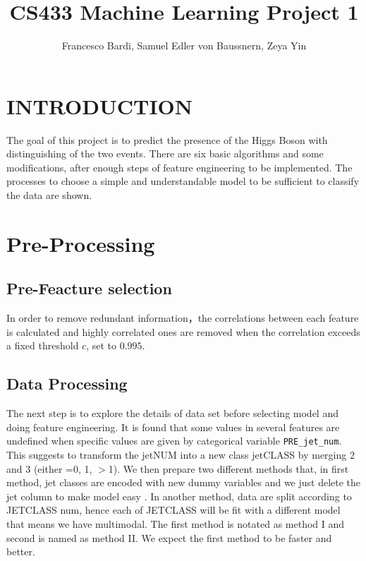 \documentclass[letterpaper, 10 pt, conference]{ieeeconf}  %
\title{\LARGE \bf
CS433 Machine Learning Project 1 
}
\author{Francesco Bardi, Samuel Edler von Baussnern, Zeya Yin %
}
\begin{document}
\maketitle
\thispagestyle{empty}
\pagestyle{empty}





\section{INTRODUCTION}
The goal of this project is to predict the presence of the Higgs Boson with distinguishing of the two events. There are six basic algorithms and some modifications, after enough steps of feature engineering to be implemented.
The processes to choose a simple and understandable model to be sufficient to classify the data are shown.\\


\section{Pre-Processing}
\subsection{Pre-Feacture selection}
In order to remove redundant information，the correlations between each feature is calculated and highly correlated ones are removed when the correlation exceeds a fixed threshold $c$, set to $0.995$. 

\subsection{Data Processing}
The next step is to explore the details of data set before selecting model and doing feature engineering. It is found that some values in several features are undefined when specific values are given by categorical variable \texttt{PRE\_jet\_num}. This suggests to transform the jetNUM
into a new class jetCLASS by merging 2 and 3 (either =0, 1, $>$1). We then prepare two different methods that, in first method, jet classes are encoded with new dummy variables and we just delete the jet column to make model easy . In another method, data are split according to JETCLASS num, hence each of JETCLASS will be fit with a different model that means we have multimodal. The first method is notated as method I and second is named as method II.
We expect the first method to be faster and better.
\end{document}
